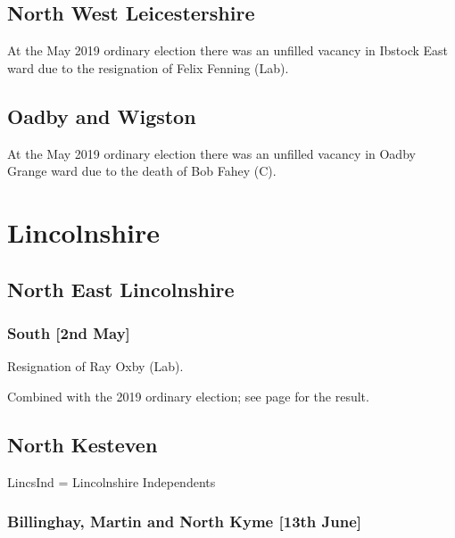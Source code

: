 \documentclass[a4paper,openany]{book}
\begin{document}
\begin{resultsiii}
\subsection*{North West Leicestershire}

At the May 2019 ordinary election there was an unfilled vacancy in Ibstock East ward due to the resignation of Felix Fenning (Lab).

\subsection*{Oadby and Wigston}

At the May 2019 ordinary election there was an unfilled vacancy in Oadby Grange ward due to the death of Bob Fahey (C).

\section{Lincolnshire}

\subsection*{North East Lincolnshire}

\subsubsection*{South \hspace*{\fill}\nolinebreak[1]%
	\enspace\hspace*{\fill}
	[2nd May]}


Resignation of Ray Oxby (Lab).

Combined with the 2019 ordinary election; see page \pageref{NorthEastLincolnshireSouth} for the result.

\subsection*{North Kesteven}

LincsInd = Lincolnshire Independents

\subsubsection*{Billinghay, Martin and North Kyme \hspace*{\fill}\nolinebreak[1]%
	\enspace\hspace*{\fill}
	[13th June]}


\end{resultsiii}
\end{document}
